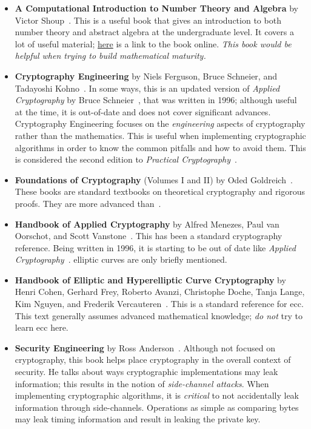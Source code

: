 \begin{itemize}
\item \textbf{A Computational Introduction to Number Theory and Algebra}
    by Victor Shoup~\cite{ComputationalIntroNTA}.
    This is a useful book that gives an introduction to both
    \gls{number theory} and abstract algebra at the undergraduate level.
    It covers a lot of useful material;
    \href{https://shoup.net/ntb/}{here} is a link to the book online.
    \emph{This book would be helpful when trying to build
    mathematical maturity.}
\item \textbf{Cryptography Engineering}
    by Niels Ferguson, Bruce Schneier, and Tadayoshi Koh\-no~\cite{CryptoEng}.
    In some ways, this is an updated version of \emph{Applied Cryptography}
    by Bruce Schneier~\cite{AppliedCrypto},
    that was written in 1996;
    although useful at the time, it is out-of-date and does not cover
    significant advances.
    Cryptography Engineering focuses on the \emph{engineering}
    aspects of cryptography rather than the mathematics.
    This is useful when implementing cryptographic algorithms in order
    to know the common pitfalls and how to avoid them.
    This is considered the second edition to
    \emph{Practical Cryptography}~\cite{PracticalCryptography}.
\item \textbf{Foundations of Cryptography} (Volumes I and II)
    by Oded Goldreich~\cite{FoundationsCrypto1,FoundationsCrypto2}.
    These books are standard textbooks on theoretical cryptography
    and rigorous proofs.
    They are more advanced than~\cite{IntroModernCrypto}.
\item \textbf{Handbook of Applied Cryptography}
    by Alfred Menezes, Paul van Oorschot,
    and Scott Vanstone~\cite{HandbookAppliedCrypto}.
    This has been a standard cryptography reference.
    Being written in 1996, it is starting to be out of date
    like \emph{Applied Cryptography}~\cite{AppliedCrypto}.
    \Glspl{elliptic curve} are only briefly mentioned.
\item \textbf{Handbook of Elliptic and Hyperelliptic Curve Cryptography}
    by Henri Cohen, Gerhard Frey, Roberto Avanzi, Christophe Doche,
    Tanja Lange, Kim Nguyen, and Frederik Vercauteren~\cite{HandbookECC}.
    This is a standard reference for \gls{ecc}.
    This text generally assumes advanced mathematical knowledge;
    \emph{do not} try to learn \gls{ecc} here.
\item \textbf{Security Engineering} by Ross Anderson~\cite{SecurityEng}.
    Although not focused on cryptography,
    this book helps place cryptography in the overall context of security.
    He talks about ways cryptographic implementations may leak information;
    this results in the notion of \emph{side-channel attacks}.
    When implementing cryptographic algorithms,
    it is \emph{critical} to not accidentally leak information
    through side-channels.
    Operations as simple as comparing bytes may leak timing information
    and result in leaking the private key.
\end{itemize}

